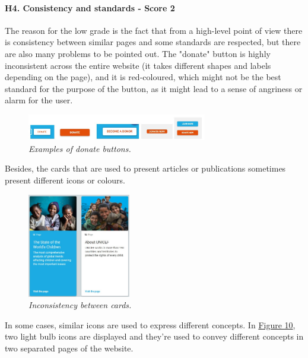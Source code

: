 \paragraph{H4. Consistency and standards - Score 2} \label{subsec:H4}	The reason for the low grade is the fact that from a high-level point of view there is consistency between similar pages and some standards are respected, but there are also many problems to be pointed out.
\newline The "donate" button is highly inconsistent across the entire website (it takes different shapes and labels depending on the page), and it is red-coloured, which might not be the best standard for the purpose of the button, as it might lead to a sense of angriness or alarm for the user.
\begin{figure}[!h]
	\begin{center}
		\includegraphics[width=0.7\textwidth]{FinalScores8.jpg}
		\captionsetup{font=small}
		\caption{\textit{Examples of donate buttons.}}
	\end{center}
\end{figure}
\newline Besides, the cards that are used to present articles or publications sometimes present different icons or colours.
\begin{figure}[!h]
	\begin{center}
		\includegraphics[width=0.4\textwidth]{FinalScores9.jpg}
		\captionsetup{font=small}
		\caption{\textit{Inconsistency between cards.}}
	\end{center}
\end{figure}

In some cases, similar icons are used to express different concepts. In \hyperref[fig:fig10]{Figure 10}, two light bulb icons are displayed and they're used to convey different concepts in two separated pages of the website.


